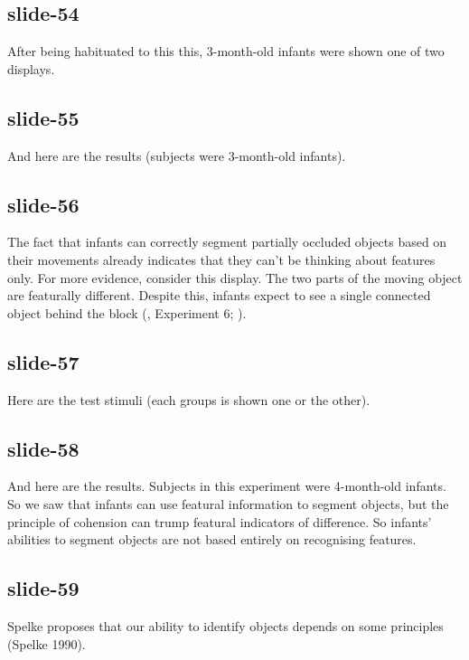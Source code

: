 \documentclass[12pt,\papersize]{extarticle}
\begin{document}
 
\subsection{slide-54}
After being habituated to this this, 3-month-old infants were shown one of two displays.
 
 
\subsection{slide-55}
And here are the results (subjects were 3-month-old infants).
 
 
\subsection{slide-56}
The fact that infants can correctly segment partially occluded objects based on their movements already indicates that they can't be thinking about features only.
For more evidence, consider this display.
The two parts of the moving object are featurally different.
Despite this, infants expect to see a single connected object behind the block (\citealp{kellman:1983_perception}, Experiment 6; \citealp{Spelke:1990jn}).
 
 
\subsection{slide-57}
Here are the test stimuli (each groups is shown one or the other).
 
 
\subsection{slide-58}
And here are the results.
Subjects in this experiment were 4-month-old infants.
So we saw that infants can use featural information to segment objects, but the principle of cohension can trump featural indicators of difference.
So infants' abilities to segment objects are not based entirely on recognising features.
 
 
\subsection{slide-59}
Spelke proposes that our ability to identify objects depends on some principles (Spelke 1990).
 
 
\end{document}
